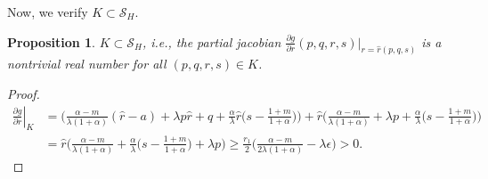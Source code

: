 \documentclass[a4paper,11pt]{article}
\newtheorem{proposition}{Proposition}[section]
\newtheorem{definition}{Definition}[section]
\theoremstyle{remark}
\begin{document}
Now, we verify $K\subset \mathcal{S}_H$. %
\begin{proposition}
$K\subset \mathcal{S}_H$, i.e., the partial jacobian $\frac{\partial g}{\partial r}(p,q,r,s)|_{r=\hat{r}(p,q,s)}$ is a nontrivial real number for all $(p,q,r,s)\in K$. %
\end{proposition}
\begin{proof}
 \begin{align*}
 \left.\frac{\partial g}{\partial r}\right|_{K} &= \Big(\frac{\alpha-m}{\lambda(1+\alpha)}(\hat{r}-a) + \lambda p\hat{r} + q +\frac{\alpha}{\lambda}\hat{r}\big(s- \frac{1+m}{1+\alpha}\big)\Big) + \hat{r}\Big(\frac{\alpha-m}{\lambda(1+\alpha)} + \lambda p + \frac{\alpha}{\lambda}\big(s- \frac{1+m}{1+\alpha}\big)\Big)\\
 &= \hat{r}\Big(\frac{\alpha-m}{\lambda(1+\alpha)} + \frac{\alpha}{\lambda}\big(s- \frac{1+m}{1+\alpha}\big) + \lambda p\Big)\ge \frac{r_1}{2}\Big(\frac{\alpha-m}{2\lambda(1+\alpha)} - \lambda \epsilon\Big)>0.
 \end{align*}
\end{proof}
\end{document}
